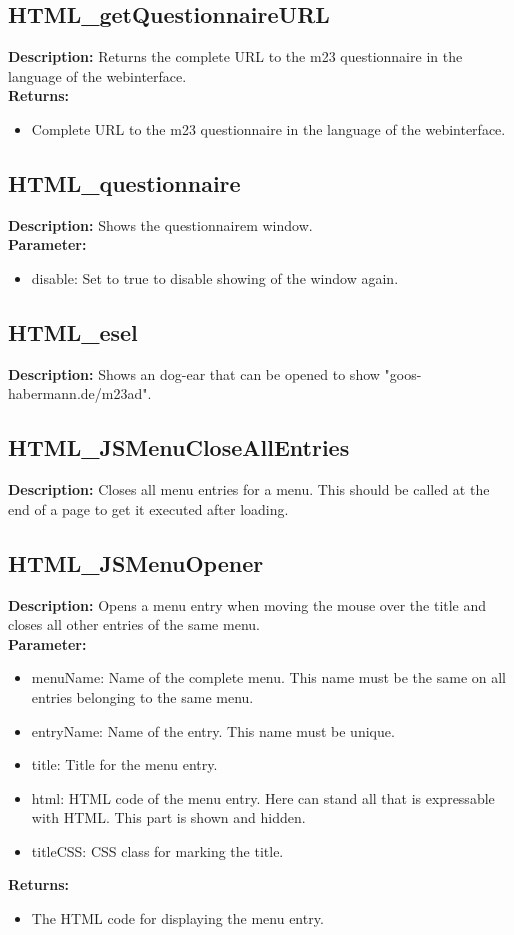 \subsection{HTML\_getQuestionnaireURL}
\textbf{Description:} Returns the complete URL to the m23 questionnaire in the language of the webinterface.\\
\textbf{Returns:}
\begin{itemize}
\item Complete URL to the m23 questionnaire in the language of the webinterface.
\end{itemize}

\subsection{HTML\_questionnaire}
\textbf{Description:} Shows the questionnairem window.\\
\textbf{Parameter:}
\begin{itemize}
\item disable: Set to true to disable showing of the window again.
\end{itemize}

\subsection{HTML\_esel}
\textbf{Description:} Shows an dog-ear that can be opened to show "goos-habermann.de/m23ad".\\

\subsection{HTML\_JSMenuCloseAllEntries}
\textbf{Description:} Closes all menu entries for a menu. This should be called at the end of a page to get it executed after loading.\\

\subsection{HTML\_JSMenuOpener}
\textbf{Description:} Opens a menu entry when moving the mouse over the title and closes all other entries of the same menu.\\
\textbf{Parameter:}
\begin{itemize}
\item menuName: Name of the complete menu. This name must be the same on all entries belonging to the same menu.
\item entryName: Name of the entry. This name must be unique.
\item title: Title for the menu entry.
\item html: HTML code of the menu entry. Here can stand all that is expressable with HTML. This part is shown and hidden.
\item titleCSS: CSS class for marking the title.
\end{itemize}
\textbf{Returns:}
\begin{itemize}
\item The HTML code for displaying the menu entry.
\end{itemize}

